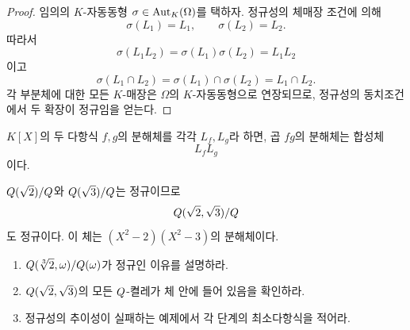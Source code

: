 \begin{proof}
임의의 $K$-자동동형 $\sigma\in\operatorname{Aut}_K(\Omega)$를 택하자. 정규성의 체매장 조건에 의해
\[
  \sigma(L_1)=L_1,
  \qquad
  \sigma(L_2)=L_2.
\]
따라서
\[
  \sigma(L_1L_2)
  =\sigma(L_1)\sigma(L_2)=L_1L_2
\]
이고
\[
  \sigma(L_1\cap L_2)
  =\sigma(L_1)\cap\sigma(L_2)
  =L_1\cap L_2.
\]
각 부분체에 대한 모든 $K$-매장은 $\Omega$의 $K$-자동동형으로 연장되므로, 정규성의 동치조건에서 두 확장이 정규임을 얻는다.
\end{proof}

\begin{corollary}
$K[X]$의 두 다항식 $f,g$의 분해체를 각각 $L_f,L_g$라 하면, 곱 $fg$의 분해체는 합성체
\[
  L_fL_g
\]
이다.
\end{corollary}

\begin{example}
$Q(\sqrt2)/Q$와 $Q(\sqrt3)/Q$는 정규이므로
\[
  Q(\sqrt2,\sqrt3)/Q
\]
도 정규이다. 이 체는 $(X^2-2)(X^2-3)$의 분해체이다.
\end{example}

\begin{checkpoint}
\begin{enumerate}[label=(\alph*)]
  \item $Q(\sqrt[3]{2},\omega)/Q(\omega)$가 정규인 이유를 설명하라.
  \item $Q(\sqrt2,\sqrt3)$의 모든 $Q$-켤레가 체 안에 들어 있음을 확인하라.
  \item 정규성의 추이성이 실패하는 예제에서 각 단계의 최소다항식을 적어라.
\end{enumerate}
\end{checkpoint}
